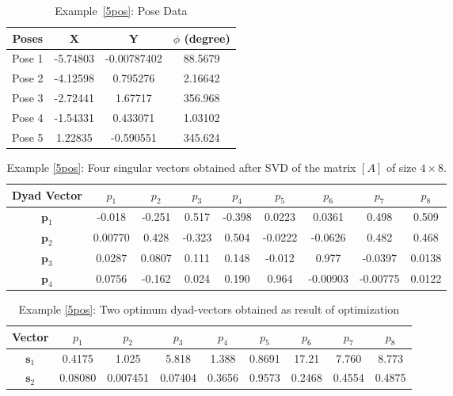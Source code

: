 \begin{table}
\caption{Example~\ref{5pos}: Pose Data}
\centering
\label{5posMotion}
\begin{tabular}{cccc}
\hline
Poses & X & Y & $\phi$ (degree)\\
\hline
Pose 1 &  -5.74803 & -0.00787402 & 88.5679 \\
Pose 2 &  -4.12598 & 0.795276 & 2.16642 \\
Pose 3 &  -2.72441 & 1.67717 & 356.968 \\
Pose 4 &   -1.54331 & 0.433071 & 1.03102 \\
Pose 5 &   1.22835 & -0.590551 & 345.624 \\
\hline
\end{tabular}
\end{table}

\begin{table}[thb]
  \caption{Example \ref{5pos}: Four singular vectors obtained after SVD of the matrix $[A]$ of size $4\times8$.}
  \centering
  \begin{tabular}{ccccccccc}
  \hline
  Dyad Vector &$p_1$&$p_2$&$p_3$&$p_4$&$p_5$&$p_6$&$p_7$&$p_8$\\
    \hline
$\textbf{p}_1$& -0.018 & -0.251 & 0.517 & -0.398 & 0.0223 & 0.0361 & 0.498 & 0.509\\
$\textbf{p}_2$&0.00770 & 0.428 & -0.323 & 0.504 & -0.0222 & -0.0626 & 0.482 & 0.468\\
$\textbf{p}_3$& 0.0287 & 0.0807 & 0.111 & 0.148 & -0.012 & 0.977 & -0.0397 & 0.0138\\
$\textbf{p}_4$& 0.0756 & -0.162 & 0.024 & 0.190 & 0.964 & -0.00903 & -0.00775 & 0.0122\\
    \hline
  \end{tabular}
  \label{svectors5pos}
\end{table}

\begin{table}[thb]
  \caption{Example \ref{5pos}: Two optimum dyad-vectors obtained as result of optimization}
  \centering
  \begin{tabular}{ccccccccc}
  \hline
  Vector &$p_1$&$p_2$&$p_3$&$p_4$&$p_5$&$p_6$&$p_7$&$p_8$\\
   \hline
$\textbf{s}_1$&0.4175 & 1.025 & 5.818 & 1.388 & 0.8691 & 17.21 & 7.760 & 8.773 \\
$\textbf{s}_2$&0.08080 & 0.007451 & 0.07404 & 0.3656 & 0.9573 & 0.2468 & 0.4554 & 0.4875\\
   \hline
  \end{tabular}
  \label{dyadvectors5pos}
\end{table}

